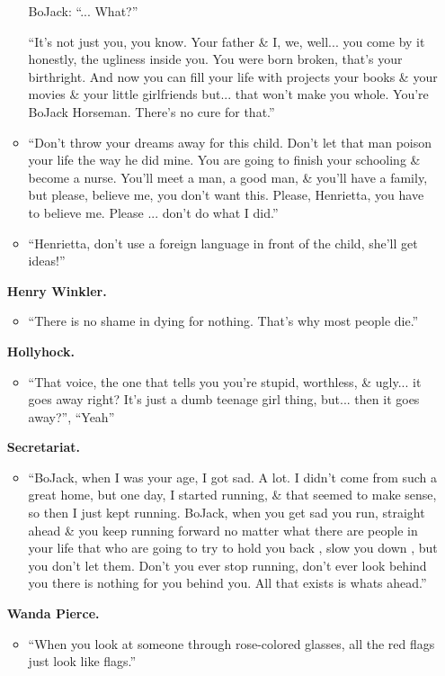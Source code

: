\documentclass{article}
\begin{document}
\begin{enumerate}
\begin{itemize}
    	BoJack: ``... What?''
    	
    	``It's not just you, you know. Your father \& I, we, well... you come by it honestly, the ugliness inside you. You were born broken, that's your birthright. And now you can fill your life with projects your books \& your movies \& your little girlfriends but... that won't make you whole. You're BoJack Horseman. There's no cure for that.''
    	\item ``Don't throw your dreams away for this child. Don't let that man poison your life the way he did mine. You are going to finish your schooling \& become a nurse. You'll meet a man, a good man, \& you'll have a family, but please, believe me, you don't want this. Please, Henrietta, you have to believe me. Please ... don't do what I did.''
    	\item ``Henrietta, don't use a foreign language in front of the child, she'll get ideas!''
    \end{itemize}
    {\bf Henry Winkler.}
    \begin{itemize}
    	\item ``There is no shame in dying for nothing. That's why most people die.''
    \end{itemize}
    {\bf Hollyhock.}
    \begin{itemize}
    	\item ``That voice, the one that tells you you're stupid, worthless, \& ugly... it goes away right? It's just a dumb teenage girl thing, but... then it goes away?'', ``Yeah''
    \end{itemize}
    {\bf Secretariat.}
    \begin{itemize}
    	\item ``BoJack, when I was your age, I got sad. A lot. I didn't come from such a great home, but one day, I started running, \& that seemed to make sense, so then I just kept running. BoJack, when you get sad you run, straight ahead \& you keep running forward no matter what there are people in your life that who are going to try to hold you back , slow you down , but you don't let them. Don't you ever stop running, don't ever look behind you there is nothing for you behind you. All that exists is whats ahead.'' 
    \end{itemize}
    {\bf Wanda Pierce.}
    \begin{itemize}
    	\item ``When you look at someone through rose-colored glasses, all the red flags just look like flags.''
    \end{itemize}

\end{enumerate}
\end{document}
